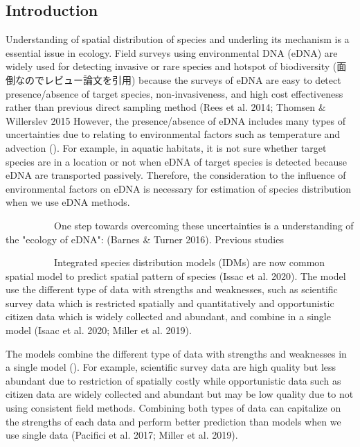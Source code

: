\documentclass[12pt]{article}
\begin{document}
\newpage
\begin{linenumbers}
\section{Introduction}
Understanding of spatial distribution of species and underling its mechanism is a essential issue in ecology.
Field surveys using environmental DNA (eDNA) are widely used for detecting invasive or rare species and hotspot of biodiversity (面倒なのでレビュー論文を引用) because the surveys of eDNA are easy to detect presence/absence of target species, non-invasiveness, and high cost effectiveness rather than previous direct sampling method (Rees et al. 2014; Thomsen \& Willerslev 2015 %
However, the presence/absence of eDNA includes many types of uncertainties due to relating to environmental factors such as temperature and advection ().
For example, in aquatic habitats, it is not sure whether target species are in a location or not when eDNA of target species is detected because eDNA are transported passively.
Therefore, the consideration to the influence of environmental factors on eDNA is necessary for estimation of species distribution when we use eDNA methods.

\ \ \ \ \ \ \ \ \ \ 
One step towards overcoming these uncertainties is a understanding of the "ecology of eDNA":  (Barnes \& Turner 2016). Previous studies

\ \ \ \ \ \ \ \ \ \ 
Integrated species distribution models (IDMs) are now common spatial model to predict spatial pattern of species (Issac et al. 2020).
The model use the different type of data with strengths and weaknesses, such as scientific survey data which is restricted spatially and quantitatively and opportunistic citizen data which is widely collected and abundant, and combine in a single model (Isaac et al. 2020; Miller et al. 2019).

The models combine the different type of data with strengths and weaknesses in a single model ().
For example, scientific survey data are high quality but less abundant due to restriction of spatially costly while opportunistic data such as citizen data are widely collected and abundant but may be low quality due to not using consistent field methods.
Combining both types of data can capitalize on the strengths of each data and perform better prediction than models when we use single data (Pacifici et al. 2017; Miller et al. 2019).




\end{linenumbers}
\end{document}
